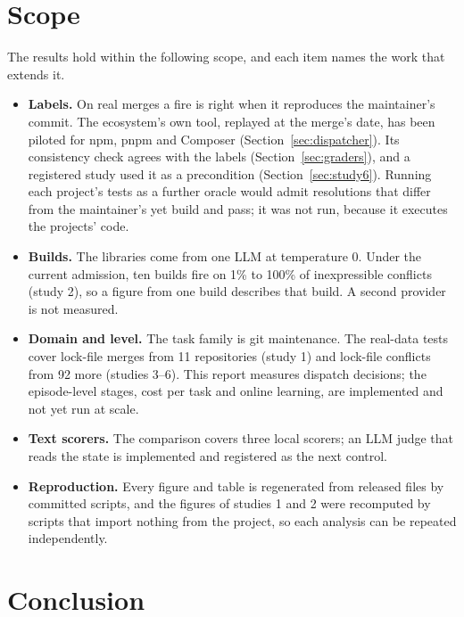\documentclass[11pt]{article}
\begin{document}
\section{Scope}

The results hold within the following scope, and each item names the work that extends it.

\begin{itemize}
  \item \textbf{Labels.} On real merges a fire is right when it reproduces the maintainer's
  commit. The ecosystem's own tool, replayed at the merge's date, has been piloted for npm, pnpm
  and Composer (Section~\ref{sec:dispatcher}). Its consistency check agrees with the labels
  (Section~\ref{sec:graders}), and a registered study used it as a precondition
  (Section~\ref{sec:study6}). Running each project's tests as a further oracle would admit
  resolutions that differ from the maintainer's yet build and pass; it was not run, because it
  executes the projects' code.
  \item \textbf{Builds.} The libraries come from one LLM at temperature 0. Under the current
  admission, ten builds fire on 1\% to 100\% of inexpressible conflicts (study 2), so a figure
  from one build describes that build. A second provider is not measured.
  \item \textbf{Domain and level.} The task family is git maintenance. The real-data tests cover
  lock-file merges from 11 repositories (study 1) and lock-file conflicts from 92 more
  (studies 3--6). This report measures dispatch decisions; the
  episode-level stages, cost per task and online learning, are implemented and not yet run at
  scale.
  \item \textbf{Text scorers.} The comparison covers three local scorers; an LLM judge that reads
  the state is implemented and registered as the next control.
  \item \textbf{Reproduction.} Every figure and table is regenerated from released files by
  committed scripts, and the figures of studies 1 and 2 were recomputed by scripts that import
  nothing from the project, so each analysis can be repeated independently.
\end{itemize}

\section{Conclusion}
\label{sec:conclusion}
\end{document}
